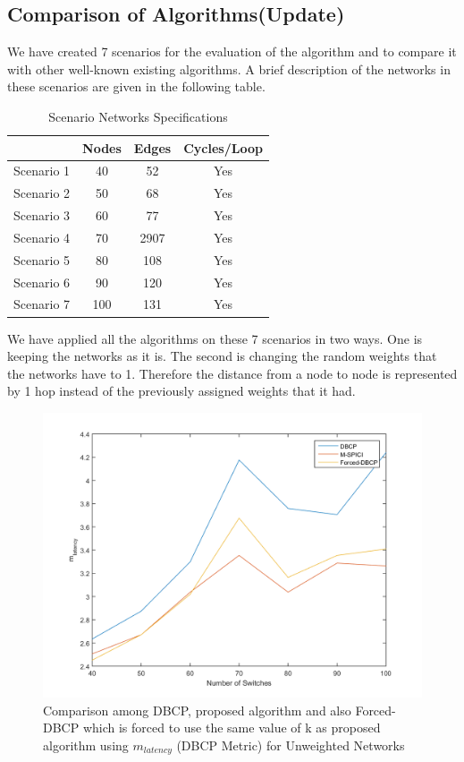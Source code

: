 \documentclass[10pt]{extarticle}
\begin{document}
	\subsection{Comparison of Algorithms(Update)} \label{comp}
	
	We have created 7 scenarios for the evaluation of the algorithm and to compare it with other well-known existing algorithms. A brief description of the networks in these scenarios are given in the following table.
	\begin{table}
		\begin{center}
			\caption{Scenario Networks Specifications} \label{scenarios}
			\begin{tabular}{|l|c|c|c|}
				\hline
				& Nodes & Edges & Cycles/Loop \\
				\hline
				Scenario 1 & 40 & 52 & Yes \\
				Scenario 2 & 50 & 68 & Yes \\
				Scenario 3 & 60 & 77 & Yes \\
				Scenario 4 & 70 & 2907 & Yes \\
				Scenario 5 & 80 & 108 & Yes \\
				Scenario 6 & 90 & 120 & Yes \\
				Scenario 7 & 100 & 131 & Yes \\
				\hline
			\end{tabular}
		\end{center}
	\end{table}
			
	We have applied all the algorithms on these 7 scenarios in two ways. One is keeping the networks as it is. The second is changing the random weights that the networks have to 1. Therefore the distance from a node to node is represented by 1 hop instead of the previously assigned weights that it had.

	\begin{figure}
		\includegraphics[width=\linewidth]{newgraph.png}
		\caption{Comparison among DBCP, proposed algorithm and also Forced-DBCP which is forced to use the same value of k as proposed algorithm using $m_{latency}$ (DBCP Metric) for Unweighted Networks}
		\label{fig:unewgraph}
	\end{figure}
\end{document}
